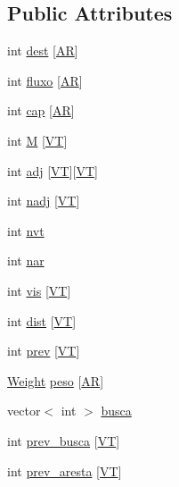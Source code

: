 \subsection*{Public Attributes}
\begin{DoxyCompactItemize}
\item 
int \hyperlink{structgrafo_a6751e45609f4a149777b66dd5ff96500}{dest} \mbox{[}\hyperlink{graph_8cpp_ac843c0057dd3c27be5adf02b375afdff}{AR}\mbox{]}
\item 
int \hyperlink{structgrafo_a1a01117c115b6e46836acee7fecf4404}{fluxo} \mbox{[}\hyperlink{graph_8cpp_ac843c0057dd3c27be5adf02b375afdff}{AR}\mbox{]}
\item 
int \hyperlink{structgrafo_a184d92c96da2626c210fa357ec8074d1}{cap} \mbox{[}\hyperlink{graph_8cpp_ac843c0057dd3c27be5adf02b375afdff}{AR}\mbox{]}
\item 
int \hyperlink{structgrafo_acbd9d2d558d6a83e532cdb3bb28462a8}{M} \mbox{[}\hyperlink{graph_8cpp_a20f277d32265358719bd03001c486f7d}{VT}\mbox{]}
\item 
int \hyperlink{structgrafo_a88380f36b7398a523a785c6f44739763}{adj} \mbox{[}\hyperlink{graph_8cpp_a20f277d32265358719bd03001c486f7d}{VT}\mbox{]}\mbox{[}\hyperlink{graph_8cpp_a20f277d32265358719bd03001c486f7d}{VT}\mbox{]}
\item 
int \hyperlink{structgrafo_a450e34672fc91f3110624960dce776d9}{nadj} \mbox{[}\hyperlink{graph_8cpp_a20f277d32265358719bd03001c486f7d}{VT}\mbox{]}
\item 
int \hyperlink{structgrafo_af1120d4d39a8d9461cb14c5698ccc5e9}{nvt}
\item 
int \hyperlink{structgrafo_a6d60c28e301f0d721e81a5730d600cdb}{nar}
\item 
int \hyperlink{structgrafo_adf60afc6ee1e48ca29afe8f5574841d9}{vis} \mbox{[}\hyperlink{graph_8cpp_a20f277d32265358719bd03001c486f7d}{VT}\mbox{]}
\item 
int \hyperlink{structgrafo_ac6986319622a1a15a63942a3648ec56d}{dist} \mbox{[}\hyperlink{graph_8cpp_a20f277d32265358719bd03001c486f7d}{VT}\mbox{]}
\item 
int \hyperlink{structgrafo_ae3d3ff234ff61762daac88fc09c15052}{prev} \mbox{[}\hyperlink{graph_8cpp_a20f277d32265358719bd03001c486f7d}{VT}\mbox{]}
\item 
\hyperlink{graph_8cpp_aa4dd30204ac53d8c88cfd0cab7b81789}{Weight} \hyperlink{structgrafo_a9b7c937f400c11fbaabeee69f5bb8d05}{peso} \mbox{[}\hyperlink{graph_8cpp_ac843c0057dd3c27be5adf02b375afdff}{AR}\mbox{]}
\item 
vector$<$ int $>$ \hyperlink{structgrafo_a611d95f6a3ae0587b52af7cfb9194dd8}{busca}
\item 
int \hyperlink{structgrafo_aad10cbd81087dd567b2ec3146e515748}{prev\_\-busca} \mbox{[}\hyperlink{graph_8cpp_a20f277d32265358719bd03001c486f7d}{VT}\mbox{]}
\item 
int \hyperlink{structgrafo_af1366a8328922dd40543a4adf73ad92a}{prev\_\-aresta} \mbox{[}\hyperlink{graph_8cpp_a20f277d32265358719bd03001c486f7d}{VT}\mbox{]}
\end{DoxyCompactItemize}



